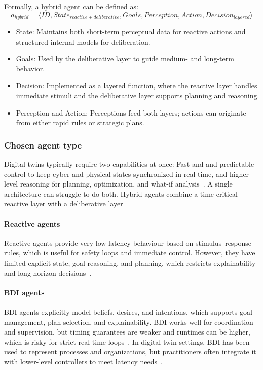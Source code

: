 Formally, a hybrid agent can be defined as:
\begin{equation*}
a_{hybrid}= \langle ID, State_{reactive+deliberative}, Goals, Perception, Action, Decision_{layered} \rangle
\end{equation*}
\begin{itemize}
    \item State: Maintains both short-term perceptual data for reactive actions and structured internal models for deliberation.

    \item Goals: Used by the deliberative layer to guide medium- and long-term behavior.

    \item Decision: Implemented as a layered function, where the reactive layer handles immediate stimuli and the deliberative layer supports planning and reasoning.

    \item Perception and Action: Perceptions feed both layers; actions can originate from either rapid rules or strategic plans.
\end{itemize}

\subsubsection{Chosen agent type}

Digital twins typically require two capabilities at once: Fast and and predictable control to keep cyber and physical states synchronized in real time, and higher-level reasoning for planning, optimization, and what-if analysis~\cite{jones2020characterising, kritzinger2018digital, tan2024dtsync, Liu2024DTMMReview}. A single architecture can struggle to do both. Hybrid agents combine a time-critical reactive layer with a deliberative layer~\cite{gat1998three, bonasso1997experiences, ark}

\paragraph{Reactive agents}
Reactive agents provide very low latency behaviour based on stimulus–response rules, which is useful for safety loops and immediate control. However, they have limited explicit state, goal reasoning, and planning, which restricts explainability and long-horizon decisions~\cite{Wooldridge2009MAS, gat1998three}.

\paragraph{BDI agents}
BDI agents explicitly model beliefs, desires, and intentions, which supports goal management, plan selection, and explainability. BDI works well for coordination and supervision, but timing guarantees are weaker and runtimes can be higher, which is risky for strict real-time loops~\cite{rao1995bdi}. In digital-twin settings, BDI has been used to represent processes and organizations, but practitioners often integrate it with lower-level controllers to meet latency needs~\cite{marah2024adaptive, Alelaimat2023XPlaM}.

